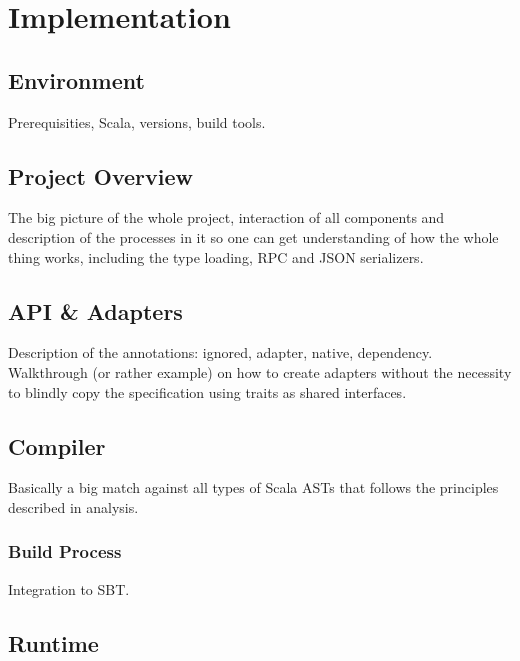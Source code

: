 \documentclass[12pt,a4paper]{report}
\begin{document}





\chapter{Implementation}

\section{Environment}

Prerequisities, Scala, versions, build tools.

\section{Project Overview}

The big picture of the whole project, interaction of all components and description of the processes in it so one can get understanding of how the whole thing works, including the type loading, RPC and JSON serializers.

\section{API \& Adapters}

Description of the annotations: ignored, adapter, native, dependency. Walkthrough (or rather example) on how to create adapters without the necessity to blindly copy the specification using traits as shared interfaces.

\section{Compiler}

Basically a big match against all types of Scala ASTs that follows the principles described in analysis.

\subsection{Build Process}

Integration to SBT.

\section{Runtime}
\end{document}
